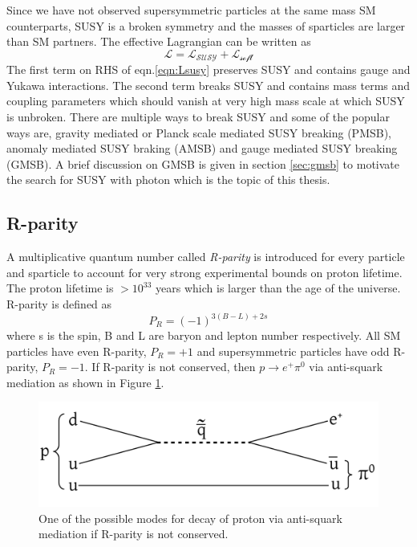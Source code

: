 Since we have not observed supersymmetric particles at the same mass SM counterparts, SUSY is a broken symmetry and the masses of 
sparticles are larger than SM partners. The effective Lagrangian can be written as
\begin{equation}
\label{eqn:Lsusy}
\mathcal{L} = \mathcal{L_{\text{SUSY}}} + \mathcal{L_\text{{soft}}}
\end{equation}
The first term on RHS of eqn.\ref{eqn:Lsusy} preserves SUSY and contains gauge and Yukawa interactions. The second term breaks SUSY and 
contains mass terms and coupling parameters which should vanish at very high mass scale at which SUSY is unbroken. There are multiple ways 
to break SUSY and some of the popular ways are, gravity mediated or Planck scale mediated SUSY breaking (PMSB), anomaly mediated SUSY 
braking (AMSB) and gauge mediated SUSY breaking (GMSB). A brief discussion on GMSB is given in section \ref{sec:gmsb} to motivate the 
search for SUSY with photon which is the topic of this thesis.

\subsection{R-parity}
A multiplicative quantum number called \textit{R-parity} is introduced for every particle and sparticle to account for very strong 
experimental bounds on proton lifetime. The proton lifetime is $>10^{33}$ years \cite{PhysRevLett.102.141801} which is larger than the age 
of the universe.
R-parity is defined as
\begin{equation}
\label{eqn:rparity}
P_R = (-1)^{3(B-L)+2s}
\end{equation}
where s is the spin, B and L are baryon and lepton number respectively. All SM particles have even R-parity, $P_R=+1$ and 
supersymmetric particles have odd R-parity, $P_R=-1$. If R-parity is not conserved, then $p\to e^+\pi^{0}$ via anti-squark mediation as 
shown in Figure \ref{fig:protonDecay}.
\begin{figure}[h!]
\centering
\includegraphics[width=0.7\linewidth]{../Figures/Chap1/protonDecay}
\caption[Proton decay diagram]{One of the possible modes for decay of proton via anti-squark mediation if R-parity is not conserved.}
\label{fig:protonDecay}
\end{figure}

